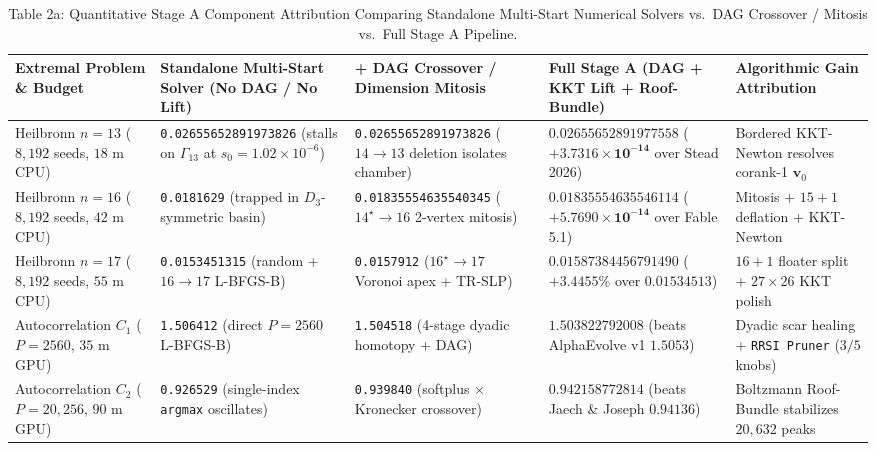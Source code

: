 \documentclass[11pt,a4paper]{article}
\begin{document}
\begin{table}[ht!]
\centering
\caption{Table 2a: Quantitative Stage A Component Attribution Comparing Standalone Multi-Start Numerical Solvers vs.\ DAG Crossover / Mitosis vs.\ Full Stage A Pipeline.}
\label{tab:stage_a_attribution}
\label{tab:stage_ab}
\footnotesize
\begin{tabular}{p{3.0cm}p{3.4cm}p{3.4cm}p{3.4cm}p{2.4cm}}
\toprule
\textbf{Extremal Problem \& Budget} & \textbf{Standalone Multi-Start Solver (No DAG / No Lift)} & \textbf{+ DAG Crossover / Dimension Mitosis} & \textbf{Full Stage A (DAG + KKT Lift + Roof-Bundle)} & \textbf{Algorithmic Gain Attribution} \\
\midrule
Heilbronn $n = 13$ ($8,192$ seeds, $18\text{ m}$ CPU) & \texttt{0.02655652891973826} (stalls on $\Gamma_{13}$ at $s_0=1.02\times 10^{-6}$) & \texttt{0.02655652891973826} ($14\to 13$ deletion isolates chamber) & $\mathbf{0.02655652891977558}$ ($\mathbf{+3.7316\times 10^{-14}}$ over Stead 2026) & Bordered KKT-Newton resolves corank-1 $\mathbf{v}_0$ \\
\addlinespace
Heilbronn $n = 16$ ($8,192$ seeds, $42\text{ m}$ CPU) & \texttt{0.0181629} (trapped in $D_3$-symmetric basin) & \texttt{0.01835554635540345} ($14^\star \to 16$ 2-vertex mitosis) & $\mathbf{0.01835554635546114}$ ($\mathbf{+5.7690\times 10^{-14}}$ over Fable 5.1) & Mitosis + $15+1$ deflation + KKT-Newton \\
\addlinespace
Heilbronn $n = 17$ ($8,192$ seeds, $55\text{ m}$ CPU) & \texttt{0.0153451315} (random + $16\to 17$ L-BFGS-B) & \texttt{0.0157912} ($16^\star \to 17$ Voronoi apex + TR-SLP) & $\mathbf{0.01587384456791490}$ ($\mathbf{+3.4455\%}$ over $0.01534513$) & $16+1$ floater split + $27\times 26$ KKT polish \\
\addlinespace
Autocorrelation $C_1$ ($P=2560$, $35\text{ m}$ GPU) & \texttt{1.506412} (direct $P=2560$ L-BFGS-B) & \texttt{1.504518} (4-stage dyadic homotopy + DAG) & $\mathbf{1.503822792008}$ (beats AlphaEvolve v1 $1.5053$) & Dyadic scar healing + \texttt{RRSI Pruner} ($3/5$ knobs) \\
\addlinespace
Autocorrelation $C_2$ ($P=20,256$, $90\text{ m}$ GPU) & \texttt{0.926529} (single-index \texttt{argmax} oscillates) & \texttt{0.939840} (softplus $\times$ Kronecker crossover) & $\mathbf{0.942158772814}$ (beats Jaech \& Joseph $0.94136$) & Boltzmann Roof-Bundle stabilizes $20,632$ peaks \\
\bottomrule
\end{tabular}
\end{table}
\end{document}
